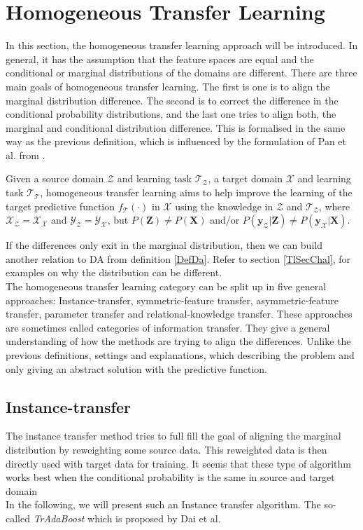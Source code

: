 \section{Homogeneous Transfer Learning}\label{TlSecHomo}
In this section, the homogeneous transfer learning approach will be introduced.
In general, it has the assumption that the feature spaces are equal and the conditional or marginal distributions of the domains are different.
There are three main goals of homogeneous transfer learning.
The first is one is to align the marginal distribution difference.
The second is to correct the difference in the conditional probability distributions, and the last one tries to align both, the marginal and conditional distribution difference.\cite[p. 6]{Weiss.2016}
This is formalised in the same way as the previous definition, which is influenced by the formulation of Pan et al. from \cite{Pan.2010}.
\begin{mDef}\label{DefHomogeneous}
	Given a source domain $\mathcal{Z}$ and learning task $\mathcal{T_Z}$, a target domain $\mathcal{X}$ and learning task $\mathcal{T_T}$, homogeneous transfer learning aims to help improve the learning of the target predictive function $f_\mathcal{T}(\cdot)$ in $\mathcal{X}$ using the knowledge in $\mathcal{Z}$ and $\mathcal{T_Z}$, where $\mathcal{X_Z} = \mathcal{X_X}$ and $\mathcal{Y_Z} =\mathcal{Y_X} $, but $P(\mathbf{Z}) \neq P(\mathbf{X})$ and/or $P(\mathbf{y_\mathcal{Z}}\vert \mathbf{Z}) \neq P(\mathbf{y_\mathcal{X}}\vert \mathbf{X})$.\cite[p. 4]{Weiss.2016}
\end{mDef}
If the differences only exit in the marginal distribution, then we can build another relation to \acl{DA} from definition \ref{DefDa}.
Refer to section \ref{TlSecChal}, for examples on why the distribution can be different.\cite[p. 6-7]{Weiss.2016}\\ 
The homogeneous transfer learning category can be split up in five general approaches:
Instance-transfer, symmetric-feature transfer, asymmetric-feature transfer, parameter transfer and relational-knowledge transfer.
These approaches are sometimes called categories of information transfer.
They give a general understanding of how the methods are trying to align the differences.\cite[p. 6-7]{Weiss.2016}
Unlike the previous definitions, settings and explanations, which describing the problem and only giving an abstract solution with the predictive function.
\subsection{Instance-transfer}\label{TlSubSecInstance}
The instance transfer method tries to full fill the goal of aligning the marginal distribution by reweighting some source data.
This reweighted data is then directly used with target data for training.
It seems that these type of algorithm works best when the conditional probability is the same in source and target domain \cite[p. 6]{Weiss.2016}\\
In the following, we will present such an Instance transfer algorithm.
The so-called \textit{TrAdaBoost} which is proposed by Dai et al.\cite{Pan.2010}\\

